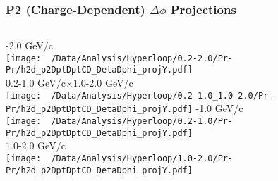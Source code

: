 \documentclass{beamer}
\begin{document}
\begin{frame}
	\frametitle{P2 (Charge-Dependent) $\Delta\phi$ Projections}
	\begin{columns}
		-2.0 GeV/c\\
		\texttt{[image: ~/Data/Analysis/Hyperloop/0.2-2.0/Pr-Pr/h2d\_p2DptDptCD\_DetaDphi\_projY.pdf]}\\0.2-1.0 GeV/c$\times$1.0-2.0 GeV/c\\
		\texttt{[image: ~/Data/Analysis/Hyperloop/0.2-1.0\_1.0-2.0/Pr-Pr/h2d\_p2DptDptCD\_DetaDphi\_projY.pdf]}
		-1.0 GeV/c\\
		\texttt{[image: ~/Data/Analysis/Hyperloop/0.2-1.0/Pr-Pr/h2d\_p2DptDptCD\_DetaDphi\_projY.pdf]}\\1.0-2.0 GeV/c\\
		\texttt{[image: ~/Data/Analysis/Hyperloop/1.0-2.0/Pr-Pr/h2d\_p2DptDptCD\_DetaDphi\_projY.pdf]}
	\end{columns}
\end{frame}
\end{document}
